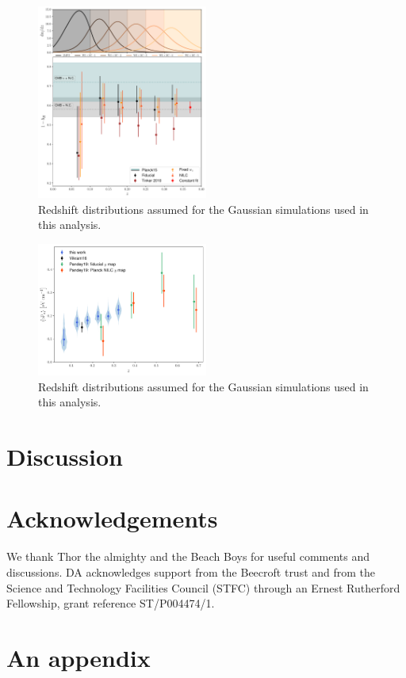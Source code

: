 \documentclass[useAMS,usenatbib]{mn2e}
\begin{document}
  \begin{figure}
    \centering
    \includegraphics[width=0.5\textwidth]{./figures/bhydro.pdf}
    \caption{Redshift distributions assumed for the Gaussian simulations used in this analysis.}
    \label{fig:bh}
  \end{figure}
  \begin{figure}
    \centering
    \includegraphics[width=0.5\textwidth]{./figures/by.pdf}
    \caption{Redshift distributions assumed for the Gaussian simulations used in this analysis.}
    \label{fig:by}
  \end{figure}

\section{Discussion}\label{sec:discussion}
  \lipsum[2]

\section*{Acknowledgements}
  We thank Thor the almighty and the Beach Boys for useful comments and discussions. DA acknowledges support from the Beecroft trust and from the Science and Technology Facilities Council (STFC) through an Ernest Rutherford Fellowship, grant reference ST/P004474/1.
  
\setlength{\bibhang}{2.0em}
\setlength{}


\appendix
\section{An appendix}\label{app:app}
  \lipsum[3]
\end{document}
